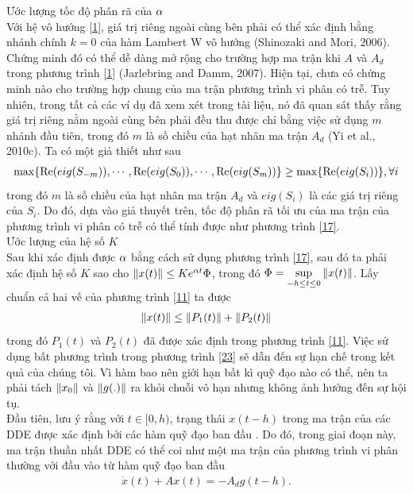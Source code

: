 \begin{cm}
Ước lượng tốc độ phân rã của $\alpha$\\
	Với hệ vô hướng \eqref{1}, giá trị riêng ngoài cùng bên phải có thể xác định bằng nhánh chính $k =0$ của hàm Lambert W vô hướng (Shinozaki and Mori, 2006). Chứng minh đó có thể dễ dàng mở rộng cho trường hợp ma trận khi $A$ và $A_d$ trong phương trình \eqref{1} (Jarlebring	and Damm, 2007). Hiện tại, chưa có chứng minh nào cho trường hợp chung của ma trận phương trình vi phân có trễ. Tuy nhiên, trong tất cả các ví dụ đã xem xét trong tài liệu,  nó đã quan sát thấy rằng giá trị riêng nằm ngoài cùng bên phải đều thu được chỉ bằng việc sử dụng $m$ nhánh đầu tiên, trong đó $m$ là số chiều của hạt nhân ma trận $A_d$ (Yi et al., 2010c). Ta có một giả thiết như sau
	\begin{align}\label{22}
		\max \{\mathrm{Re} (eig(S_{-m})), \cdots, \mathrm{Re} (eig(S_{0})), \cdots, \mathrm{Re} (eig(S_{m})) \} \ge \max \{ \mathrm{Re} (eig(S_{i}))\} , \forall i
	\end{align} 
	trong đó $m$ là số chiều của hạt nhân ma trận $A_d$ và $eig(S_i)$ là các giá trị riêng của $S_i$. Do đó, dựa vào giả thuyết trên, tốc độ phân rã tối ưu của ma trận của phương trình vi phân có trễ  có thể tính được như phương trình \eqref{17}.\\
Ước lượng của hệ số $K$\\
	Sau khi xác định được $\alpha$ bằng cách sử dụng phương trình \eqref{17}, sau đó ta phải xác định hệ số $K$ sao cho $\Vert x(t) \Vert \le K e^{\alpha t} \Phi$, trong đó $\Phi = \sup\limits_{-h \le t \le 0} \Vert x(t) \Vert$. 	Lấy chuẩn cả hai vế của phương trình \eqref{11} ta được
\begin{align}\label{23}
	\Vert x(t) \Vert \le \Vert P_1(t) \Vert + \Vert P_2(t)\Vert
\end{align}	
trong đó $P_1(t)$ và $P_2(t)$ đã được xác định trong phương trình \eqref{11}. Việc sử dụng bất phương trình trong phương trình \eqref{23} sẽ dẫn đến sự hạn chế  trong kết quả của chúng tôi. Vì hàm bao nên giới hạn bất kì quỹ đạo nào có thể, nên ta phải tách $\Vert x_0 \Vert$ và $\Vert g (.) \Vert$ ra khỏi chuỗi vô hạn nhưng không ảnh hưởng đến sự hội tụ.\\
Đầu tiên, lưu ý rằng với $t \in [0,h)$,  trạng thái $x(t-h)$ trong ma trận của các DDE được xác định bởi các hàm quỹ đạo ban đầu . Do đó, trong giai đoạn này, ma trận thuần nhất DDE có thể coi như một ma trận của phương trình vi phân thường với đầu vào từ hàm quỹ đạo ban đầu 
\begin{align}\label{24}
	\dot{x}(t) + Ax(t) = -A_dg(t-h).
\end{align}

\end{cm}
